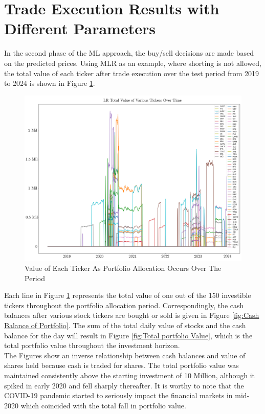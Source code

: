 \documentclass[a4paper,12pt]{report}
\numberwithin{equation}{section}
\theoremstyle{definition}
\begin{document}
\section{Trade Execution Results with Different Parameters}
In the second phase of the ML approach, the buy/sell decisions are made based on the predicted prices. Using MLR as an example, where shorting is not allowed, the total value of each ticker after trade execution over the test period from 2019 to 2024 is shown in Figure \ref{fig:portfolio_movement}.

\begin{figure}[H]
  \centerline{\includegraphics[width=16cm]{ML_portfolio_value_movement}}
  \caption{Value of Each Ticker As Portfolio Allocation Occurs Over The Period}
  \label{fig:portfolio_movement}
\end{figure}

Each line in Figure \ref{fig:portfolio_movement} represents the total value of one out of the 150 investible tickers throughout the portfolio allocation period. Correspondingly, the cash balances after various stock tickers are bought or sold is given in Figure \ref{fig:Cash Balance of Portfolio}. The sum of the total daily value of stocks and the cash balance for the day will result in Figure \ref{fig:Total portfolio Value}, which is the total portfolio value throughout the investment horizon.\\

The Figures show an inverse relationship between cash balances and value of shares held because cash is traded for shares. The total portfolio value was maintained consistently above the starting investment of 10 Million, although it spiked in early 2020 and fell sharply thereafter. It is worthy to note that the COVID-19 pandemic started to seriously impact the financial markets in mid-2020 which coincided with the total fall in portfolio value. \\
\end{document}
